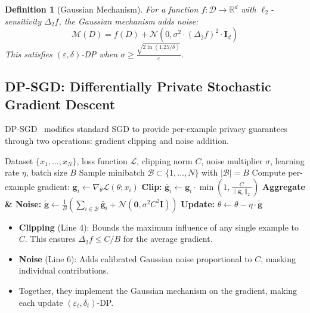 \documentclass[11pt, a4paper]{article}
\newtheorem{definition}[theorem]{Definition}
\newcommand{\eps}{\varepsilon}
\newcommand{\R}{\mathbb{R}}
\begin{document}
\begin{definition}[Gaussian Mechanism]
For a function $f: \mathcal{D} \rightarrow \R^d$ with $\ell_2$-sensitivity $\Delta_2 f$, the Gaussian mechanism adds noise:
\begin{equation}
\mathcal{M}(D) = f(D) + \mathcal{N}(0, \sigma^2 \cdot (\Delta_2 f)^2 \cdot \mathbf{I}_d)
\end{equation}
This satisfies $(\eps, \delta)$-DP when $\sigma \geq \frac{\sqrt{2 \ln(1.25/\delta)}}{\eps}$.
\end{definition}

\subsection{DP-SGD: Differentially Private Stochastic Gradient Descent}

DP-SGD~\cite{abadi2016deep} modifies standard SGD to provide per-example privacy guarantees through two operations: gradient clipping and noise addition.

\begin{algorithm}[H]
\caption{DP-SGD Training (per iteration)}
\label{alg:dpsgd}
\begin{algorithmic}[1]
\Require Dataset $\{x_1, \ldots, x_N\}$, loss function $\mathcal{L}$, clipping norm $C$, noise multiplier $\sigma$, learning rate $\eta$, batch size $B$
\State Sample minibatch $\mathcal{B} \subset \{1, \ldots, N\}$ with $|\mathcal{B}| = B$
    \State Compute per-example gradient: $\mathbf{g}_i \leftarrow \nabla_\theta \mathcal{L}(\theta; x_i)$
    \State \textbf{Clip:} $\bar{\mathbf{g}}_i \leftarrow \mathbf{g}_i \cdot \min\left(1, \frac{C}{\|\mathbf{g}_i\|_2}\right)$
\EndFor
\State \textbf{Aggregate \& Noise:} $\tilde{\mathbf{g}} \leftarrow \frac{1}{B}\left(\sum_{i \in \mathcal{B}} \bar{\mathbf{g}}_i + \mathcal{N}(\mathbf{0}, \sigma^2 C^2 \mathbf{I})\right)$
\State \textbf{Update:} $\theta \leftarrow \theta - \eta \cdot \tilde{\mathbf{g}}$
\end{algorithmic}
\end{algorithm}

\begin{keyresult}
\begin{itemize}
  \item \textbf{Clipping} (Line 4): Bounds the maximum influence of any single example to $C$. This ensures $\Delta_2 f \leq C/B$ for the average gradient.
  \item \textbf{Noise} (Line 6): Adds calibrated Gaussian noise proportional to $C$, masking individual contributions.
  \item Together, they implement the Gaussian mechanism on the gradient, making each update $(\eps_t, \delta_t)$-DP.
\end{itemize}
\end{keyresult}
\end{document}
